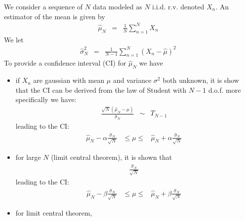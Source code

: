 


We consider a sequence of $N$ data modeled as $N$ i.i.d. r.v. denoted $X_{n}$. An estimator of the mean is given by
\begin{eqnarray*}
\hat \mu_{N} &=&\frac{1}{N}\sum_{n=1}^{N}X_{n}
\end{eqnarray*}
We let
\begin{eqnarray*}
\hat\sigma_{N}^{2} &=& \frac{1}{N-1}\sum_{n=1}^{N}(X_{n}-\hat \mu)^{2}
\end{eqnarray*}
To provide a confidence interval (CI) for $\hat\mu_{N}$ we have
\begin{itemize}
\item
if $X_{n}$ are gaussian with mean $\mu$ and variance $\sigma^{2}$ both unknown, it is show that the CI can be derived from the law of Student with $N-1$ d.o.f. more specifically we have:
\begin{eqnarray*}
\frac{\sqrt{N}(\hat \mu_{N} -\mu)}{\hat\sigma_{N}}&\sim&T_{N-1}
\end{eqnarray*}
leading to the CI:
\begin{eqnarray*}
\hat\mu_{N}-\alpha\frac{\hat\sigma_{N}}{\sqrt{N}}
&
 \leq\mu\leq
&
\hat\mu_{N}+\alpha\frac{\hat\sigma_{N}}{\sqrt{N}}
\end{eqnarray*}

\item
for large $N$ (limit central theorem), it is shown that 
\begin{eqnarray*}
\frac{\hat\sigma_{N}}{\sqrt{N}}
\end{eqnarray*}
leading to the CI:
\begin{eqnarray*}
\hat\mu_{N}-\beta\frac{\hat\sigma_{N}}{\sqrt{N}}
&
 \leq\mu\leq
&
\hat\mu_{N}+\beta\frac{\hat\sigma_{N}}{\sqrt{N}}
\end{eqnarray*}

\item
for limit central theorem, 

\end{itemize}